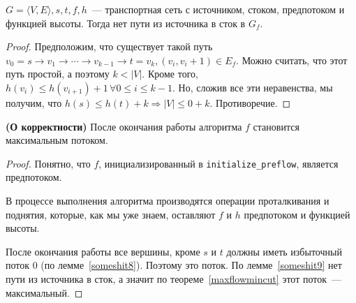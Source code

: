 \begin{lemma}\label{someshit9}
	$G=\langle V,E\rangle,s,t,f,h$~--- транспортная сеть с источником, стоком, предпотоком и функцией высоты. Тогда нет пути из источника в сток в $G_f$.
\end{lemma}
\begin{proof}
	Предположим, что существует такой путь $v_0=s\to v_1\to\cdots\to v_{k-1}\to t=v_k, (v_i,v_i+1)\in E_f$.
	Можно считать, что этот путь простой, а поэтому $k<|V|$.
	Кроме того, $h(v_i)\le h(v_{i+1})+1\,\forall 0\le i\le k-1$. Но, сложив все эти неравенства, мы получим, что $h(s)\le h(t)+k\Rightarrow |V|\le 0+k$. Противоречие.
\end{proof}
\begin{theorem} {\bf (О корректности)}
	После окончания работы алгоритма $f$ становится максимальным потоком.
\end{theorem}
\begin{proof}
	Понятно, что $f$, инициализированный в \texttt{initialize\_preflow}, является предпотоком.

	В процессе выполнения алгоритма производятся операции проталкивания и поднятия, которые, как мы уже знаем, оставляют $f$ и $h$ предпотоком и функцией высоты.

	После окончания работы все вершины, кроме $s$ и $t$ должны иметь избыточный поток 0 (по лемме~\ref{someshit8}). Поэтому это поток. По лемме~\ref{someshit9} нет пути из источника в сток, а значит по теореме~\ref{maxflowmincut} этот поток~--- максимальный.
\end{proof}

